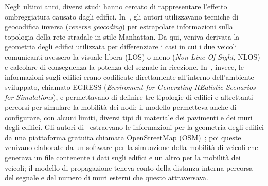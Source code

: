 Negli ultimi anni, diversi studi hanno cercato di rappresentare l'effetto ombreggiatura causato dagli edifici.
In~\cite{Giordano:2010:CST:1860058.1860065}, gli autori utilizzavano tecniche di geocodifica inversa (\textit{reverse geocoding}) per estrapolare
informazioni sulla topologia della rete stradale in stile Manhattan. Da qui, veniva derivata la geometria degli edifici utilizzata
per differenziare i casi in cui i due veicoli comunicanti avessero la visuale libera (LOS) o meno (\textit{Non Line Of Sight}, NLOS)
e calcolare di conseguenza la potenza del segnale in ricezione.
In~\cite{4020783}, invece, le informazioni sugli edifici erano codificate direttamente all'interno dell'ambiente sviluppato, chiamato
EGRESS (\textit{Enviroment for Generating REalistic Scenarios for Simulations}), e permettavano di definire tre tipologie di edifici e altrettanti
percorsi per simulare la mobilità dei nodi; il modello permetteva anche di configurare, con alcuni limiti, diversi tipi di materiale dei pavimenti e dei muri degli edifici.
Gli autori di~\cite{Carpenter:2015:OMI:2756509.2756512} estraevano le informazioni per la geometria degli edifici da una piattaforma gratuita
chiamata OpenStreetMap (OSM)~\cite{osmWebsite}; poi queste venivano elaborate da un software per la simuazione della mobilità di veicoli
che generava un file contenente i dati sugli edifici e un altro per la mobilità dei veicoli;
il modello di propagazione teneva conto della distanza interna percorsa del segnale e del numero di muri esterni che questo attraversava.
%

